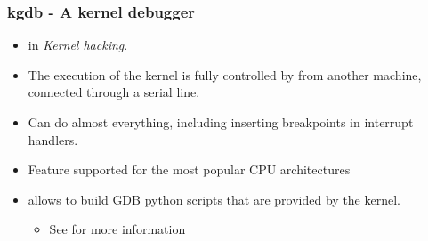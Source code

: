 
\begin{frame}
  \frametitle{kgdb - A kernel debugger}
  \begin{itemize}
  \item {} in {\em Kernel hacking}.
  \item The execution of the kernel is fully controlled by 
    from another machine, connected through a serial line.
  \item Can do almost everything, including inserting breakpoints in
    interrupt handlers.
  \item Feature supported for the most popular CPU architectures
  \item {} allows to build GDB python scripts that are
    provided by the kernel.
  \begin{itemize}
	  \item See  for more information
  \end{itemize}
  \end{itemize}
\end{frame}

